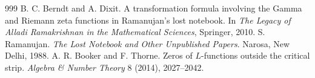 \begin{thebibliography}{999}
 B. C. Berndt and A. Dixit. A transformation formula involving the Gamma and Riemann zeta functions in Ramanujan's lost notebook. In \emph{The Legacy of Alladi Ramakrishnan in the Mathematical Sciences}, Springer, 2010. %
 S. Ramanujan. \emph{The Lost Notebook and Other Unpublished Papers}. Narosa, New Delhi, 1988. %
 A. R. Booker and F. Thorne. Zeros of $L$-functions outside the critical strip. \emph{Algebra \& Number Theory} 8 (2014), 2027--2042. %
\end{thebibliography}
